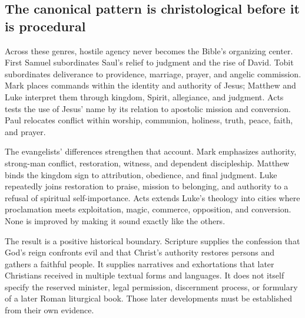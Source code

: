 \subsection{The canonical pattern is christological before it is procedural}

Across these genres, hostile agency never becomes the Bible's organizing
center. First Samuel subordinates Saul's relief to judgment and the rise of
David. Tobit subordinates deliverance to providence, marriage, prayer, and
angelic commission. Mark places commands within the identity and authority of
Jesus; Matthew and Luke interpret them through kingdom, Spirit, allegiance,
and judgment. Acts tests the use of Jesus' name by its relation to apostolic
mission and conversion. Paul relocates conflict within worship, communion,
holiness, truth, peace, faith, and prayer.

The evangelists' differences strengthen that account. Mark emphasizes
authority, strong-man conflict, restoration, witness, and dependent
discipleship. Matthew binds the kingdom sign to attribution, obedience, and
final judgment. Luke repeatedly joins restoration to praise, mission to
belonging, and authority to a refusal of spiritual self-importance. Acts
extends Luke's theology into cities where proclamation meets exploitation,
magic, commerce, opposition, and conversion. None is improved by making it
sound exactly like the others.

The result is a positive historical boundary. Scripture supplies the
confession that God's reign confronts evil and that Christ's authority restores
persons and gathers a faithful people. It supplies narratives and
exhortations that later Christians received in multiple textual forms and
languages. It does not itself specify the reserved minister, legal
permission, discernment process, or formulary of a later Roman liturgical
book. Those later developments must be established from their own evidence.
